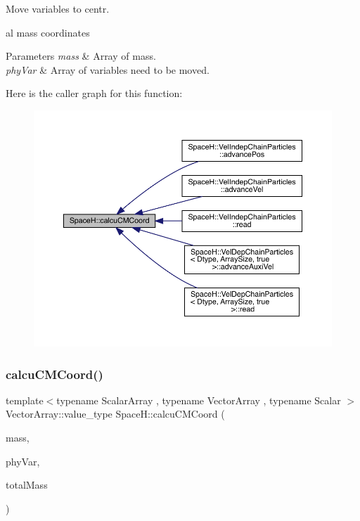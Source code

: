 Move variables to centr. 

al mass coordinates


\begin{DoxyParams}{Parameters}
{\em mass} & Array of mass. \\
\hline
{\em phy\+Var} & Array of variables need to be moved. \\
\hline
\end{DoxyParams}
Here is the caller graph for this function\+:
\nopagebreak
\begin{figure}[H]
\begin{center}
\leavevmode
\includegraphics[width=350pt]{namespace_space_h_a808af685980ae1a1ff5ea83e47f4073c_icgraph}
\end{center}
\end{figure}
\mbox{\label{namespace_space_h_a06d99fb41f10d428804c48ddb6b261c0}} 
\subsubsection{\texorpdfstring{calcu\+C\+M\+Coord()}{calcuCMCoord()}\hspace{0.1cm}{\footnotesize\ttfamily [2/2]}}
{\footnotesize\ttfamily template$<$typename Scalar\+Array , typename Vector\+Array , typename Scalar $>$ \\
Vector\+Array\+::value\+\_\+type Space\+H\+::calcu\+C\+M\+Coord (\begin{DoxyParamCaption}\item[{const Scalar\+Array \&}]{mass,  }\item[{Vector\+Array \&}]{phy\+Var,  }\item[{const \mbox{\hyperlink{create_kepler_8cpp_a8c2981f3f834be9448a6ab06c28748eb}{Scalar}}}]{total\+Mass }\end{DoxyParamCaption})}



